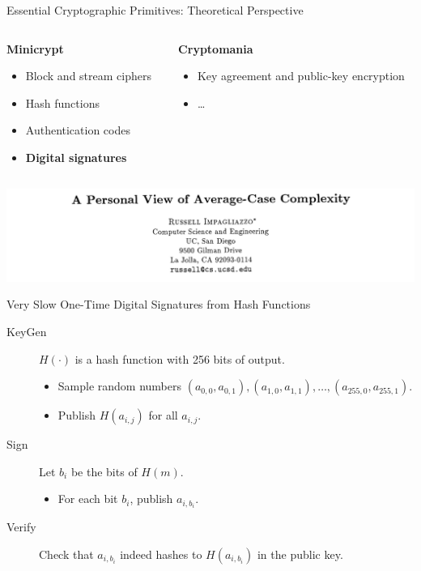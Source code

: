 \documentclass[xcolor=table,10pt,aspectratio=169]{beamer}
\begin{document}
\begin{frame}[label={sec:org387369b}]{Essential Cryptographic Primitives: Theoretical Perspective}
\begin{columns}[t]
\begin{column}{0.5\columnwidth}
\textbf{Minicrypt}

\small

\begin{itemize}
\item Block and stream ciphers
\item Hash functions
\item Authentication codes
\item \textbf{Digital signatures}
\end{itemize}
\end{column}

\begin{column}{0.5\columnwidth}
\textbf{Cryptomania}

\small

\begin{itemize}
\item Key agreement and public-key encryption
\item \ldots
\end{itemize}
\end{column}
\end{columns}

\begin{center}
\includegraphics[width=.9\linewidth]{./minicrypt-cryptomania.jpg}
\end{center}
\end{frame}

\begin{frame}[label={sec:org55be1d9}]{Very Slow One-Time Digital Signatures from Hash Functions}
\begin{description}
\item[{KeyGen}] \(H(\cdot)\) is a hash function with 256 bits of output. 
\begin{itemize}
\item Sample random numbers \((a_{0,0}, a_{0,1}), (a_{1,0}, a_{1,1}), \ldots, (a_{255,0}, a_{255,1})\).
\item Publish \(H(a_{i,j})\) for all \(a_{i,j}\).
\end{itemize}
\item[{Sign}] Let \(b_i\) be the bits of \(H(m)\). 
\begin{itemize}
\item For each bit \(b_i\), publish \(a_{i, b_i}\).
\end{itemize}
\item[{Verify}] Check that \(a_{i, b_i}\) indeed hashes to \(H(a_{i,b_i})\) in the public key.
\end{description}
\end{frame}
\end{document}

